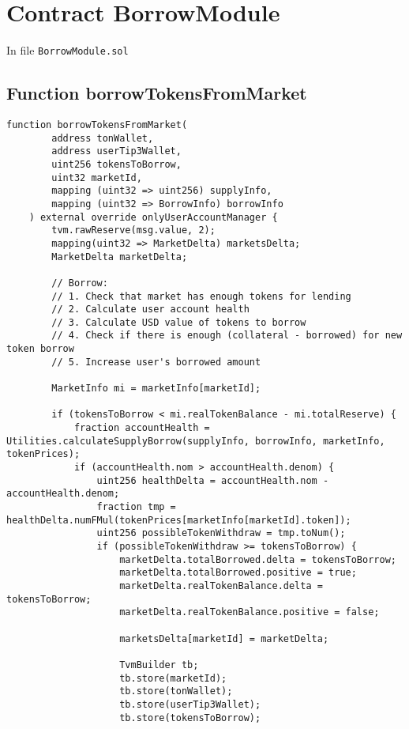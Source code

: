 
\section{Contract BorrowModule}

In file {\tt BorrowModule.sol}

\subsection{Function borrowTokensFromMarket}

\begin{lstlisting}[firstnumber=74]
    function borrowTokensFromMarket(
        address tonWallet,
        address userTip3Wallet,
        uint256 tokensToBorrow,
        uint32 marketId,
        mapping (uint32 => uint256) supplyInfo,
        mapping (uint32 => BorrowInfo) borrowInfo
    ) external override onlyUserAccountManager {
        tvm.rawReserve(msg.value, 2);
        mapping(uint32 => MarketDelta) marketsDelta;
        MarketDelta marketDelta;
        
        // Borrow:
        // 1. Check that market has enough tokens for lending
        // 2. Calculate user account health
        // 3. Calculate USD value of tokens to borrow
        // 4. Check if there is enough (collateral - borrowed) for new token borrow
        // 5. Increase user's borrowed amount

        MarketInfo mi = marketInfo[marketId];

        if (tokensToBorrow < mi.realTokenBalance - mi.totalReserve) {
            fraction accountHealth = Utilities.calculateSupplyBorrow(supplyInfo, borrowInfo, marketInfo, tokenPrices);
            if (accountHealth.nom > accountHealth.denom) {
                uint256 healthDelta = accountHealth.nom - accountHealth.denom;
                fraction tmp = healthDelta.numFMul(tokenPrices[marketInfo[marketId].token]);
                uint256 possibleTokenWithdraw = tmp.toNum();
                if (possibleTokenWithdraw >= tokensToBorrow) {
                    marketDelta.totalBorrowed.delta = tokensToBorrow;
                    marketDelta.totalBorrowed.positive = true;
                    marketDelta.realTokenBalance.delta = tokensToBorrow;
                    marketDelta.realTokenBalance.positive = false;

                    marketsDelta[marketId] = marketDelta;

                    TvmBuilder tb;
                    tb.store(marketId);
                    tb.store(tonWallet);
                    tb.store(userTip3Wallet);
                    tb.store(tokensToBorrow);


\end{lstlisting}
